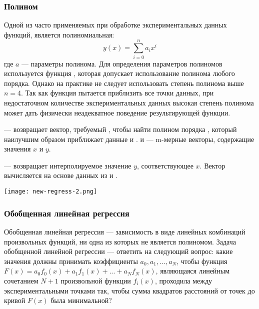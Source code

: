\subsubsection{Полином}
Одной из  часто применяемых при обработке экспериментальных данных функций, является полиномиальная:
\begin{equation}
y(x)= \sum_{i=0}^{n} a_i x^i
\end{equation}
где $a$ --- параметры полинома. Для определения параметров полиномов используется функция , которая допускает использование полинома любого порядка. Однако на практике не следует использовать степень полинома выше $n = 4$. Так как функция  пытается приблизить все точки данных, при недостаточном количестве экспериментальных данных высокая степень полинома может дать физически неадекватное поведение результирующей функции.

 --- возвращает вектор, требуемый , чтобы найти полином порядка , который наилучшим образом приближает данные  и .  и  --- m-мерные векторы, содержащие значения $x$ и $y$.

 --- возвращает интерполируемое значение $y$, соответствующее $x$. Вектор  вычисляется  на основе данных из  и .


\begin{center}
	\texttt{[image: new-regress-2.png]}
\end{center}


\subsubsection{Обобщенная линейная регрессия}
Обобщенная линейная регрессия --- зависимость в виде линейных комбинаций произвольных функций, ни одна из которых не является полиномом.
Задача обобщенной линейной регрессии --- ответить на следующий вопрос: какие значения должны принимать коэффициенты $a_0, a_1, ..., a_N$, чтобы функция  $F(x)=a_0 f_0(x)+a_1 f_1(x)+ ... + a_N f_N(x)$, являющаяся линейным сочетанием $N+1$ произвольной функции $f_i(x)$, проходила между экспериментальными точками так, чтобы сумма квадратов расстояний от точек до кривой $F(x)$ была минимальной?

